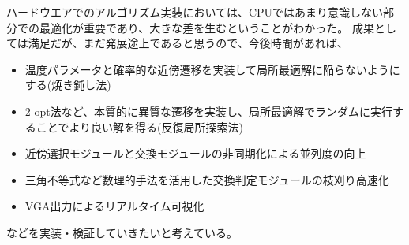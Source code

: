 ハードウエアでのアルゴリズム実装においては、CPUではあまり意識しない部分での最適化が重要であり、大きな差を生むということがわかった。
成果としては満足だが、まだ発展途上であると思うので、今後時間があれば、
\begin{itemize}
    \item 温度パラメータと確率的な近傍遷移を実装して局所最適解に陥らないようにする(焼き鈍し法)
    \item 2-opt法など、本質的に異質な遷移を実装し、局所最適解でランダムに実行することでより良い解を得る(反復局所探索法)
    \item 近傍選択モジュールと交換モジュールの非同期化による並列度の向上
    \item 三角不等式など数理的手法を活用した交換判定モジュールの枝刈り高速化
    \item VGA出力によるリアルタイム可視化
\end{itemize}
などを実装・検証していきたいと考えている。